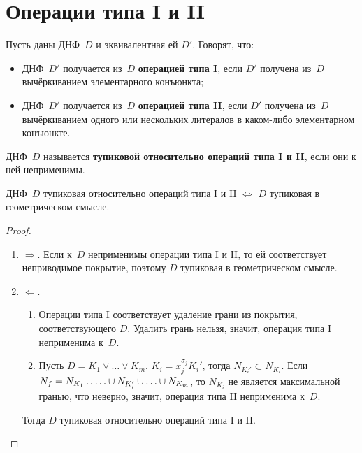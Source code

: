 \section{Операции типа I и II}
Пусть даны ДНФ~$D$ и эквивалентная ей $D'$.
Говорят, что:
\begin{itemize}
	\item ДНФ~$D'$ получается из~$D$ \textbf{операцией типа I}, если $D'$ получена из~$D$ вычёркиванием элементарного конъюнкта;
	\item ДНФ~$D'$ получается из~$D$ \textbf{операцией типа II}, если $D'$ получена из~$D$ вычёркиванием одного или нескольких литералов в каком-либо элементарном конъюнкте.
\end{itemize}

ДНФ~$D$ называется \textbf{тупиковой относительно операций типа I и II}, если они к ней неприменимы.

\begin{statement}
ДНФ~$D$ тупиковая относительно операций типа I и II $\Leftrightarrow$ $D$ тупиковая в геометрическом смысле.
\end{statement}
\begin{proof}
\begin{enumerate}
	\item $\Rightarrow$. Если к~$D$ неприменимы операции типа I и II, то ей соответствует неприводимое покрытие, поэтому $D$ тупиковая в геометрическом смысле.
	\item $\Leftarrow$.
	\begin{enumerate}
		\item Операции типа I соответствует удаление грани из покрытия, соответствующего $D$.
		Удалить грань нельзя, значит, операция типа I неприменима к~$D$.
		\item Пусть $D = K_1 \lor \ldots \lor K_m$, $K_i = x_j^{\sigma_j} K_i'$, тогда $N_{K_i'} \subset N_{K_i}$.
		Если $N_f = N_{K_1} \opbr\cup \ldots \opbr\cup N_{K_i'} \opbr\cup \ldots \opbr\cup N_{K_m}$, то $N_{K_i}$ не является максимальной гранью, что неверно, значит, операция типа II неприменима к~$D$.
	\end{enumerate}
	
	Тогда $D$ тупиковая относительно операций типа I и II.
\end{enumerate}
\end{proof}